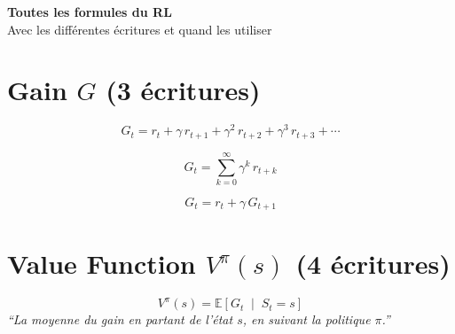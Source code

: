 \documentclass[11pt,a4paper]{article}
\newcommand{\E}{\mathbb{E}}
\begin{document}
\begin{center}
{\LARGE \textbf{Toutes les formules du RL}}\\[0.3cm]
{\large Avec les différentes écritures et quand les utiliser}
\end{center}

\vspace{0.5cm}

\section{Gain $G$ (3 écritures)}

\begin{formbox}
$$G_t = r_t + \gamma \, r_{t+1} + \gamma^2 \, r_{t+2} + \gamma^3 \, r_{t+3} + \cdots$$
\end{formbox}

\begin{formbox}
$$\boxed{G_t = \sum_{k=0}^{\infty} \gamma^k \, r_{t+k}}$$
\end{formbox}

\begin{formbox}
$$G_t = r_t + \gamma \, G_{t+1}$$
\end{formbox}


\section{Value Function $V^\pi(s)$ (4 écritures)}

\begin{formbox}
$$\boxed{V^\pi(s) = \E\left[G_t \;\middle|\; S_t = s\right]}$$
\textit{``La moyenne du gain en partant de l'état $s$, en suivant la politique $\pi$.''}
\end{formbox}
\end{document}
